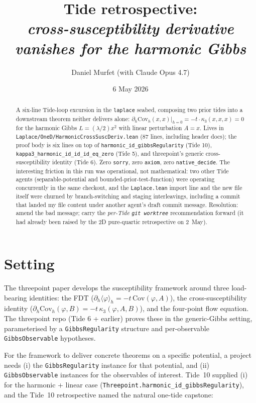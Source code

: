 \documentclass[11pt]{article}
\title{Tide retrospective:\\\emph{cross-susceptibility derivative vanishes for the harmonic Gibbs}}
\author{Daniel Murfet (with Claude Opus 4.7)}
\date{6 May 2026}
\begin{document}
\sloppy
\maketitle

\begin{abstract}
A six-line Tide-loop excursion in the \texttt{laplace} seabed,
composing two prior tides into a downstream theorem neither delivers
alone:
$\partial_h \mathrm{Cov}_h(x, x)|_{h=0} = -t\cdot\kappa_3(x,x,x) = 0$
for the harmonic Gibbs $L = (\lambda/2) x^2$ with linear perturbation
$A = x$. Lives in \texttt{Laplace/OneD/HarmonicCrossSuscDeriv.lean}
(87 lines, including header docs); the proof body is six lines on top
of \texttt{harmonic\_id\_gibbsRegularity} (Tide 10),
\texttt{kappa3\_harmonic\_id\_id\_id\_eq\_zero} (Tide 5), and
threepoint's generic cross-susceptibility identity (Tide 6). Zero
\texttt{sorry}, zero \texttt{axiom}, zero \texttt{native\_decide}.
The interesting friction in this run was operational, not
mathematical: two other Tide agents (separable-potential and
bounded-prior-test-function) were operating concurrently in the same
checkout, and the \texttt{Laplace.lean} import line and the new file
itself were churned by branch-switching and staging interleavings,
including a commit that landed my file content under another agent's
draft commit message. Resolution: amend the bad message; carry the
\emph{per-Tide \texttt{git worktree}} recommendation forward (it had
already been raised by the 2D pure-quartic retrospective on 2~May).
\end{abstract}

\section{Setting}

The threepoint paper develops the susceptibility framework around
three load-bearing identities: the FDT
($\partial_h \langle\varphi\rangle_h = -t\,\mathrm{Cov}(\varphi, A)$),
the cross-susceptibility identity
($\partial_h \mathrm{Cov}_h(\varphi, B) = -t\,\kappa_3(\varphi, A, B)$),
and the four-point flow equation. The threepoint repo (Tide 6 + earlier)
proves these in the generic-Gibbs setting, parameterised by a
\texttt{GibbsRegularity} structure and per-observable \texttt{GibbsObservable}
hypotheses.

For the framework to deliver concrete theorems on a specific
potential, a project needs (i) the \texttt{GibbsRegularity} instance
for that potential, and (ii) \texttt{GibbsObservable} instances for the
observables of interest. Tide~10 supplied (i) for the harmonic +
linear case (\texttt{Threepoint.harmonic\_id\_gibbsRegularity}), and
the Tide~10 retrospective named the natural one-tide capstone:
\end{document}
